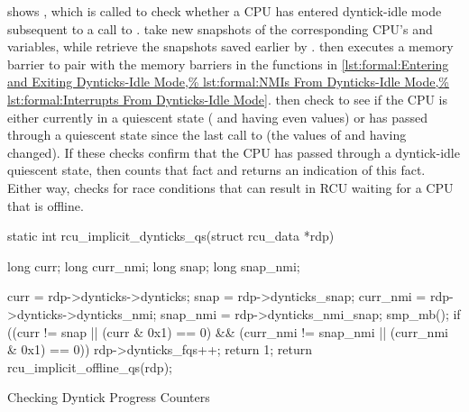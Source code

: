 \begin{fcvref}
shows , which is called to check
whether a CPU has entered dyntick-idle mode subsequent to a call
to .
 take new snapshots of the corresponding CPU's
 and  variables, while
 retrieve the snapshots saved earlier by
.
 then
executes a memory barrier to pair with the memory barriers in
the functions in
\cref{lst:formal:Entering and Exiting Dynticks-Idle Mode,%
lst:formal:NMIs From Dynticks-Idle Mode,%
lst:formal:Interrupts From Dynticks-Idle Mode}.
then check to see if the CPU is either currently in
a quiescent state ( and  having even values) or
has passed through a quiescent state since the last call to
 (the values of
 and  having changed).
If these checks confirm that the CPU has passed through a dyntick-idle
quiescent state, then  counts that fact and
 returns an indication of this fact.
Either way, 
checks for race conditions that can result in RCU
waiting for a CPU that is offline.
\end{fcvref}

\begin{listing}
\begin{fcvlabel}
\begin{VerbatimL}[commandchars=\\\[\]]
static int
rcu_implicit_dynticks_qs(struct rcu_data *rdp)
{
	long curr;
	long curr_nmi;
	long snap;
	long snap_nmi;

	curr = rdp->dynticks->dynticks;		\lnlbl[curr]
	snap = rdp->dynticks_snap;		\lnlbl[snap]
	curr_nmi = rdp->dynticks->dynticks_nmi;	\lnlbl[currn]
	snap_nmi = rdp->dynticks_nmi_snap;	\lnlbl[snapn]
	smp_mb();				\lnlbl[mb]
	if ((curr != snap || (curr & 0x1) == 0) && \lnlbl[chk_q:b]
	    (curr_nmi != snap_nmi || (curr_nmi & 0x1) == 0)) { \lnlbl[chk_q:e]
		rdp->dynticks_fqs++;		\lnlbl[cnt]
		return 1;			\lnlbl[ret_1]
	}
	return rcu_implicit_offline_qs(rdp);	
}
\end{VerbatimL}
\end{fcvlabel}
\caption{Checking Dyntick Progress Counters}
\label{lst:formal:Checking Dyntick Progress Counters}
\end{listing}

